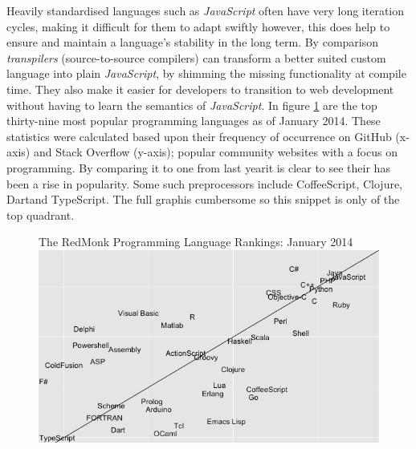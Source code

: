 \documentclass[final]{cmpreport}
\begin{document}
Heavily standardised languages such as \textit{JavaScript} often have very long iteration cycles, making it difficult for them to adapt swiftly however, this does help to ensure and maintain a language's stability in the long term. By comparison \textit{transpilers} (source-to-source compilers) can transform a better suited custom language into plain \textit{JavaScript}, by shimming the missing functionality at compile time. They also make it easier for developers to transition to web development without having to learn the semantics of \textit{JavaScript}. In figure \ref{ranking} are the top thirty-nine most popular programming languages as of January 2014. These statistics were calculated based upon their frequency of occurrence on GitHub (x-axis) and Stack Overflow (y-axis); popular community websites with a focus on programming. By comparing it to one from last year\footnotemark[12] it is clear to see their has been a rise in popularity. Some such preprocessors include CoffeeScript\footnotemark[13], Clojure\footnotemark[14], Dart\footnotemark[15] and TypeScript\footnotemark[16]. The full graph\footnotemark[17] is cumbersome so this snippet is only of the top quadrant.


\begin{figure}[h]{The RedMonk Programming Language Rankings: January 2014 \label{ranking}}
  \includegraphics[width=1.0\textwidth]{lang-rank-114-wm.png}
\end{figure}
\end{document}
